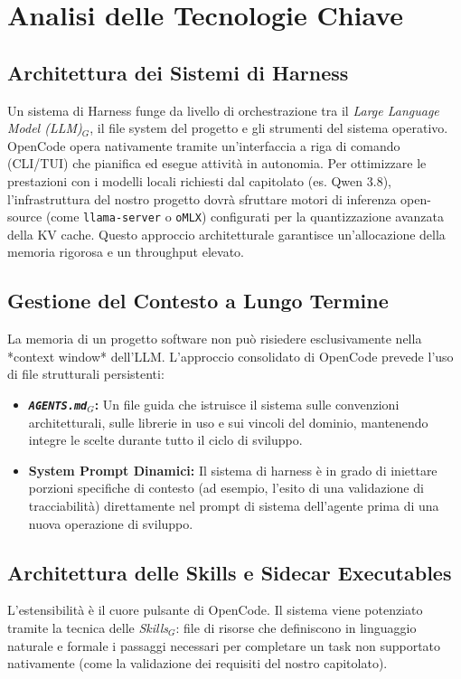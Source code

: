 \documentclass[a4paper, 11pt]{article}
\newcommand{\term}[1]{\textit{#1}$_G$}
\begin{document}
\section{Analisi delle Tecnologie Chiave}

\subsection{Architettura dei Sistemi di Harness}
Un sistema di Harness funge da livello di orchestrazione tra il \term{Large Language Model (LLM)}, il file system del progetto e gli strumenti del sistema operativo. OpenCode opera nativamente tramite un'interfaccia a riga di comando (CLI/TUI) che pianifica ed esegue attività in autonomia. Per ottimizzare le prestazioni con i modelli locali richiesti dal capitolato (es. Qwen 3.8), l'infrastruttura del nostro progetto dovrà sfruttare motori di inferenza open-source (come \texttt{llama-server} o \texttt{oMLX}) configurati per la quantizzazione avanzata della KV cache. Questo approccio architetturale garantisce un'allocazione della memoria rigorosa e un throughput elevato.

\subsection{Gestione del Contesto a Lungo Termine}
La memoria di un progetto software non può risiedere esclusivamente nella *context window* dell'LLM. L'approccio consolidato di OpenCode prevede l'uso di file strutturali persistenti:
\begin{itemize}
    \item \textbf{\texttt{\term{AGENTS.md}}:} Un file guida che istruisce il sistema sulle convenzioni architetturali, sulle librerie in uso e sui vincoli del dominio, mantenendo integre le scelte durante tutto il ciclo di sviluppo.
    \item \textbf{System Prompt Dinamici:} Il sistema di harness è in grado di iniettare porzioni specifiche di contesto (ad esempio, l'esito di una validazione di tracciabilità) direttamente nel prompt di sistema dell'agente prima di una nuova operazione di sviluppo.
\end{itemize}

\subsection{Architettura delle Skills e Sidecar Executables}
L'estensibilità è il cuore pulsante di OpenCode. Il sistema viene potenziato tramite la tecnica delle \term{Skills}: file di risorse che definiscono in linguaggio naturale e formale i passaggi necessari per completare un task non supportato nativamente (come la validazione dei requisiti del nostro capitolato). 
\end{document}
